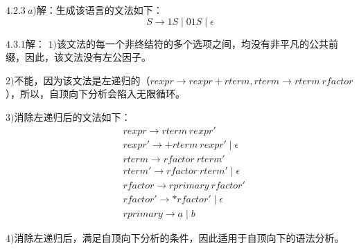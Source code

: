 \documentclass[UTF8,noindent]{ctexart}
\begin{document}
$4.2.3\ a)$解：生成该语言的文法如下：
\[S\rightarrow 1S\mid 01S\mid \epsilon\]

$4.3.1$解：
$1)$该文法的每一个非终结符的多个选项之间，均没有非平凡的公共前缀，因此，该文法没有左公因子。

$2)$不能，因为该文法是左递归的（$rexpr\rightarrow rexpr + rterm, rterm\rightarrow rterm \ rfactor$），所以，自顶向下分析会陷入无限循环。

$3)$消除左递归后的文法如下：
\begin{align*}
  &rexpr\rightarrow rterm\ rexpr' \\
  &rexpr' \rightarrow +rterm \ rexpr'\mid \epsilon\\
  &rterm \rightarrow rfactor \ rterm'\\
&rterm'\rightarrow rfactor \ rterm' \mid \epsilon\\
  &rfactor\rightarrow rprimary\ rfactor'\\
  &rfactor'\rightarrow *rfactor'\mid \epsilon\\
  &rprimary \rightarrow a\mid b
\end{align*}

$4)$消除左递归后，满足自顶向下分析的条件，因此适用于自顶向下的语法分析。
\end{document}
